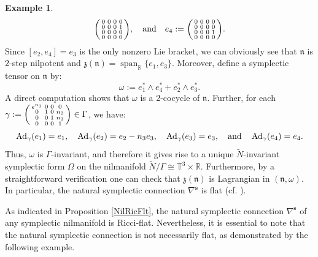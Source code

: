 \documentclass[preprint,12pt,1p]{elsarticle}
\theoremstyle{plain}
\theoremstyle{definition}
\newtheorem{example}[theorem]{Example}
\newcommand{\rel}{\mathbb{R}}
\newcommand{\n}{\nabla}
\newcommand{\ns}{\n^\mathbf{s}}
\newcommand{\w}{\omega}
\newcommand{\et}{\quad \textnormal{and}\quad}
\newcommand{\Ad}{\operatorname{Ad}}
\newcommand{\Span}{\operatorname{span}}
\numberwithin{equation}{section}
\newcommand{\nl}{\mathfrak{n}}
\begin{document}
\begin{example}
\begin{equation*}
\begin{psmallmatrix}
0&0&0&0\\
0&0&0&1\\
0&0&0&0\\
0&0&0&0\\
\end{psmallmatrix},\et e_4:=\begin{psmallmatrix}
0&0&0&0\\
0&0&0&0\\
0&0&0&1\\
0&0&0&0\\
\end{psmallmatrix}.
\end{equation*}
Since $[e_2,e_4]=e_3$ is the only nonzero Lie bracket, we can obviously see that $\nl$ is $2$-step nilpotent and $\mathfrak{z}(\nl)=\Span_\rel\{e_1,e_3\}$. Moreover, define a symplectic tensor on $\nl$ by:
\begin{equation*}
\w:=e^*_1\wedge e^*_4+e^*_2\wedge e^*_3.
\end{equation*}
A direct computation shows that $\w$ is a $2$-cocycle of $\nl$. Further, for each $\gamma:=\begin{psmallmatrix}
e^{n_1}&0&0&0\\
0&1&0&n_2\\
0&0&1&n_3\\
0&0&0&1\\
\end{psmallmatrix}\in\Gamma$, we have:
\begin{equation*}
\Ad_\gamma(e_1)=e_1,\quad\Ad_\gamma(e_2)=e_2-n_3e_3,\quad\Ad_\gamma(e_3)=e_3,\et\Ad_\gamma(e_4)=e_4.
\end{equation*}
Thus, $\w$ is $\Gamma$-invariant, and therefore it gives rise to a unique $\widetilde{N}$-invariant symplectic form $\Omega$ on the nilmanifold $\widetilde{N}/\Gamma\cong\mathbb{T}^3\times\rel$. Furthermore, by a straightforward verification one can check that $\mathfrak{z}(\nl)$ is Lagrangian in $(\nl,\w)$. In particular, the natural symplectic connection $\n^\mathbf{s}$ is flat (cf. \cite[p. $4384$]{Oili}).
\end{example}

As indicated in Proposition \ref{NilRicFlt}, the natural symplectic connection $\ns$ of any symplectic nilmanifold is Ricci-flat. Nevertheless, it is essential to note that the natural symplectic connection is not necessarily flat, as demonstrated by the following example.
\end{document}
